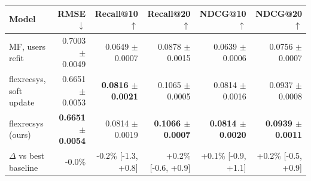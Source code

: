 \begin{tabular}{lrrrrr}
\toprule
Model & RMSE $\downarrow$ & Recall@10 $\uparrow$ & Recall@20 $\uparrow$ & NDCG@10 $\uparrow$ & NDCG@20 $\uparrow$ \\
\midrule
MF, users refit & 0.7003 $\pm$ 0.0049 & 0.0649 $\pm$ 0.0007 & 0.0878 $\pm$ 0.0015 & 0.0639 $\pm$ 0.0006 & 0.0756 $\pm$ 0.0007 \\
flexrecsys, soft update & 0.6651 $\pm$ 0.0053 & \textbf{0.0816 $\pm$ 0.0021} & 0.1065 $\pm$ 0.0005 & 0.0814 $\pm$ 0.0016 & 0.0937 $\pm$ 0.0008 \\
flexrecsys (ours) & \textbf{0.6651 $\pm$ 0.0054} & 0.0814 $\pm$ 0.0019 & \textbf{0.1066 $\pm$ 0.0007} & \textbf{0.0814 $\pm$ 0.0020} & \textbf{0.0939 $\pm$ 0.0011} \\
\midrule
$\Delta$ vs best baseline & -0.0\% & -0.2\% [-1.3, +0.8] & +0.2\% [-0.6, +0.9] & +0.1\% [-0.9, +1.1] & +0.2\% [-0.5, +0.9] \\
\bottomrule
\end{tabular}
